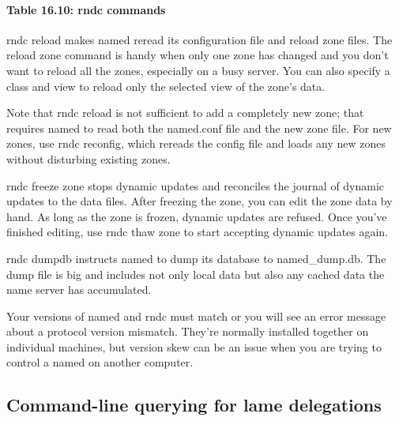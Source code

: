 \paragraph[{Table 16.10: }rndc commands]{\texorpdfstring{{Table 16.10:
}\protect\hypertarget{part0024_split_071.htmlux5cux23_idTextAnchor965}{}{}rndc
commands}{Table 16.10: rndc commands}}


\protect\hypertarget{part0024_split_071.htmlux5cux23_idIndexMarker2293}{}{}{rndc
reload} makes {named} reread its configuration file and reload zone
files. The {reload} {zone} command is handy when only one zone has
changed and you don't want to reload all the zones, especially on a busy
server. You can also specify a {class} and {view} to reload only the
selected view of the zone's data.

Note that {rndc} {reload} is not sufficient to add a completely new
zone; that requires {named} to read both the {named.conf} file and the
new zone file. For new zones, use {rndc reconfig}, which rereads the
config file and loads any new zones without disturbing existing zones.

{rndc} {freeze} {zone} stops dynamic updates and reconciles the journal
of dynamic
\protect\hypertarget{part0024_split_071.htmlux5cux23_idIndexMarker2294}{}{}updates
to the data files. After freezing the zone, you can edit the zone data
by hand. As long as the zone is frozen, dynamic updates are refused.
Once you've finished editing, use {rndc thaw} {zone} to start accepting
dynamic updates again.

{rndc dumpdb} instructs {named} to dump its database to
{named\_dump.db}. The dump file is big and includes not only local data
but also any cached data the name server has accumulated.

Your versions of {named} and {rndc} must match or you will see an error
message about a protocol version mismatch. They're normally installed
together on individual machines, but version skew can be an issue when
you are trying to control a {named} on another computer.

\protect\hypertarget{part0024_split_072.html}{}{}

\hypertarget{part0024_split_072.htmlux5cux23_idContainer1069}{}
\hypertarget{part0024_split_072.htmlux5cux23calibre_pb_71}{%
\subsection[Command-line querying for lame
delegations]{\texorpdfstring{\protect\hypertarget{part0024_split_072.htmlux5cux23_idTextAnchor966}{}{}Command-line
querying for lame
delegations}{Command-line querying for lame delegations}}\label{part0024_split_072.htmlux5cux23calibre_pb_71}}

